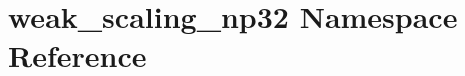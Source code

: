 \hypertarget{namespaceweak__scaling__np32}{}\section{weak\+\_\+scaling\+\_\+np32 Namespace Reference}
\label{namespaceweak__scaling__np32}
